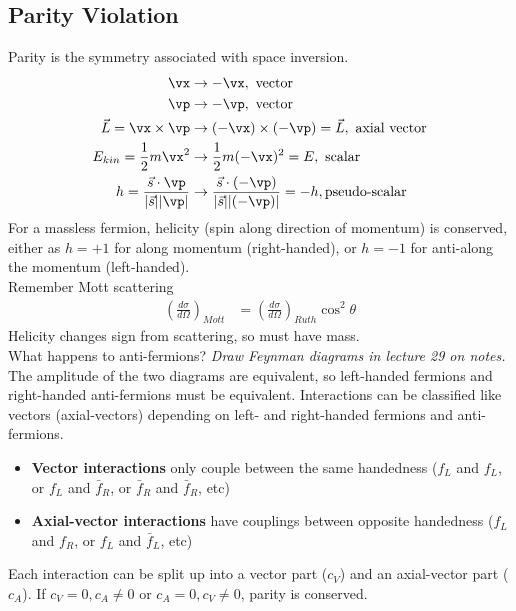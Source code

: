 \documentclass[a4paper, 11pt, normalem]{report}
\begin{document}
\chapter{}
\section{Parity Violation}
Parity is the symmetry associated with space inversion.
\begin{align}
    \vx &\to -\vx,\text{ vector} \\
    \vp &\to -\vp,\text{ vector} \\
    \vec{L} = \vx\times\vp &\to (-\vx)\times(-\vp)=\vec{L},\text{ axial vector} \\
    E_{kin} = \frac12 m\vx^2 &\to \frac12 m(-\vx)^2 = E,\text{ scalar} \\
    h = \frac{\vec{s}\cdot\vp}{|\vec{s}||\vp|} &\to \frac{\vec{s}\cdot(-\vp)}{|\vec{s}||(-\vp)|} = -h,\text{pseudo-scalar}
\end{align}
For a massless fermion, helicity (spin along direction of momentum) is conserved, either as $h=+1$ for along momentum (right-handed), or $h=-1$ for anti-along the momentum (left-handed).\\
Remember Mott scattering
\begin{align}
    \left(\frac{d\sigma}{d\Omega}\right)_{Mott} &= \left(\frac{d\sigma}{d\Omega}\right)_{Ruth}\cos^2\theta
\end{align}
Helicity changes sign from scattering, so must have mass.\\
What happens to anti-fermions?
\textit{Draw Feynman diagrams in lecture 29 on notes.}
The amplitude of the two diagrams are equivalent, so left-handed fermions and right-handed anti-fermions must be equivalent.
Interactions can be classified like vectors (axial-vectors) depending on left- and right-handed fermions and anti-fermions.
\begin{itemize}
    \item \textbf{Vector interactions} only couple between the same handedness ($f_L$ and $f_L$, or $f_L$ and $\bar{f}_R$, or $\bar{f}_R$ and $\bar{f}_R$, etc)
    \item \textbf{Axial-vector interactions} have couplings between opposite handedness ($f_L$ and $f_R$, or $f_L$ and $\bar{f}_L$, etc)
\end{itemize}
Each interaction can be split up into a vector part ($c_V$) and an axial-vector part ($c_A$).
If $c_V=0,c_A\neq0$ or $c_A=0,c_V\neq0$, parity is conserved.\\
\end{document}
